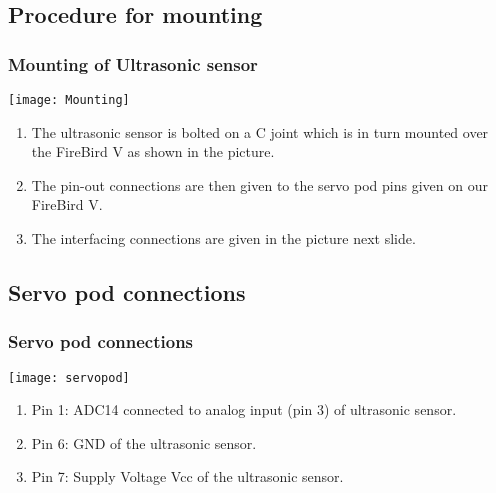 \documentclass[table,10pt,red]{beamer}	%
\begin{document}
\subsection{Procedure for mounting}
\begin{frame}
	\frametitle{Mounting of Ultrasonic sensor}
	\begin{minipage}[c]{0.4\textwidth}
				\texttt{[image: Mounting]}
			\end{minipage}
		\pause
		\hfill
			\begin{minipage}[c]{0.5\textwidth}
				\begin{enumerate}
				 
				\item <+-|alert@+> \small The ultrasonic sensor is bolted on a C joint which is in turn mounted over the FireBird V as shown in the picture.
				\item <+-|alert@+> The pin-out connections are then given to the servo pod pins given on our FireBird V.
				\item <+-|alert@+> The interfacing connections are given in the picture next slide.
				
				\end{enumerate}   
			\end{minipage}
\end{frame}
\subsection{Servo pod connections}
\begin{frame}
	\frametitle{Servo pod connections}
	\begin{minipage}[c]{0.55\textwidth}
				\texttt{[image: servopod]}
	\end{minipage}
		\pause
		\hfill
					\begin{minipage}[c]{0.4\textwidth}
						\begin{enumerate}
						 
						\item <+-|alert@+> \small Pin 1: ADC14 connected to analog input (pin 3) of ultrasonic sensor.
						\item <+-|alert@+> Pin 6: GND of the ultrasonic sensor.
						\item <+-|alert@+> Pin 7: Supply Voltage Vcc of the ultrasonic sensor.
						
						
						
						\end{enumerate}   
					\end{minipage}

\end{frame}
\end{document}
